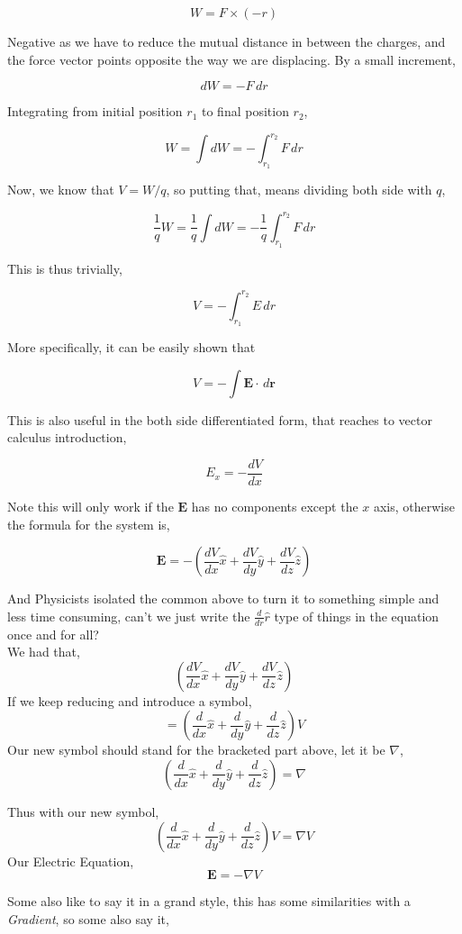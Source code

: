 \documentclass[11pt,a4paper,twocolumn,openright]{article}
\renewcommand{\vec}[1]{\boldsymbol{#1}}
\theoremstyle{definition}
\theoremstyle{definition}
\theoremstyle{definition}
\theoremstyle{definition}
\begin{document}
\[ W = F \times (-r) \]

Negative as we have to reduce the mutual distance in between the charges, and the force vector points opposite the way we are displacing. By a small increment,

\[ dW = - F \, dr \]

Integrating from initial position $r_1$ to final position $r_2$, 

\[ W = \int dW = -\int_{r_1}^{r_2} F \, dr \]

Now, we know that $ V = W/q $, so putting that, means dividing both side with $q$, 

\[ \frac{1}{q} W = \frac{1}{q} \int dW = -\frac{1}{q} \int_{r_1}^{r_2} F \, dr \]

This is thus trivially, 

\[ V = -  \int_{r_1}^{r_2} E \, dr \]

More specifically, it can be easily shown that 

\[ V = - \int \vec{E} \cdot \, d\vec{r} \]

This is also useful in the both side differentiated form, that reaches to vector calculus introduction,

\[ E_x = - \frac{dV}{dx} \]

Note this will only work if the $\vec{E}$ has no components except the $x$ axis, otherwise the formula for the system is,

\[ \vec{E} = - \left(	\frac{dV}{dx} \hat{x} + \frac{dV}{dy} \hat{y} + \frac{dV}{dz} \hat{z}\right)  \]

And Physicists isolated the common above to turn it to something simple and less time consuming, can't we just write the $\frac{d}{dr} \hat{r} $ type of things in the equation once and for all? \\
We had that,
\[ \left(	\frac{dV}{dx} \hat{x} + \frac{dV}{dy} \hat{y} + \frac{dV}{dz} \hat{z}\right)  \]
If we keep reducing and introduce a symbol,
 \[ = \left(	\frac{d}{dx} \hat{x} + \frac{d}{dy} \hat{y} + \frac{d}{dz} \hat{z} \right) V \]
 Our new symbol should stand for the bracketed part above, let it be $\nabla$,
 \[ \left(	\frac{d}{dx} \hat{x}+ \frac{d}{dy} \hat{y} + \frac{d}{dz} \hat{z} \right) = \nabla \]
 
 Thus with our new symbol, 
 \[ \left(	\frac{d}{dx} \hat{x} + \frac{d}{dy} \hat{y} + \frac{d}{dz} \hat{z} \right) V = \nabla V \]
 Our Electric Equation, 
\[ \vec{E} = - \nabla V \]

Some also like to say it in a grand style, this has some similarities with a \emph{Gradient}, so some also say it, 
\end{document}
